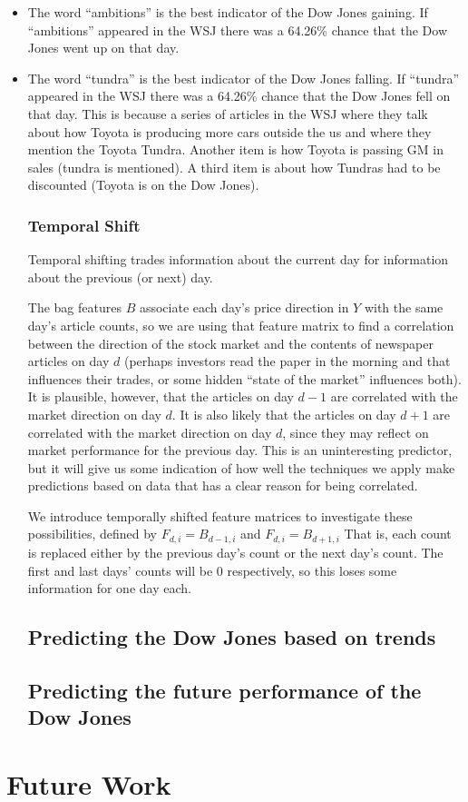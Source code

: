 \documentclass[10pt]{article}
\begin{document}
\begin{itemize}
\item The word ``ambitions'' is the best indicator of the Dow Jones gaining. If ``ambitions'' appeared in the WSJ there was a 64.26\% chance that the Dow Jones went up on that day.
\item The word ``tundra'' is the best indicator of the Dow Jones falling. If ``tundra'' appeared in the WSJ there was a 64.26\% chance that the Dow Jones fell on that day. This is because a series of articles in the WSJ where they talk about how Toyota is producing more cars outside the us and where they mention the Toyota Tundra. Another item is how Toyota is passing GM in sales (tundra is mentioned). A third item is about how Tundras had to be discounted (Toyota is on the Dow Jones).


\subsubsection*{Temporal Shift}
Temporal shifting trades information about the current day for information about the previous (or next) day.


The bag features $B$ associate each day's price direction in $Y$ with the same day's article counts, so we are using that feature matrix to find a correlation between the direction of the stock market and the contents of newspaper articles on day $d$ (perhaps investors read the paper in the morning and that influences their trades, or some hidden ``state of the market'' influences both). It is plausible, however, that the articles on day $d-1$ are correlated with the market direction on day $d$. It is also likely that the articles on day $d+1$ are correlated with the market direction on day $d$, since they may reflect on market performance for the previous day. This is an uninteresting predictor, but it will give us some indication of how well the techniques we apply make predictions based on data that has a clear reason for being correlated.

We introduce temporally shifted feature matrices to investigate these possibilities, defined by $F_{d,i} = B_{d-1,i}$ and $F_{d,i} = B_{d+1,i}$ That is, each count is replaced either by the previous day's count or the next day's count. The first and last days' counts will be 0 respectively, so this loses some information for one day each.

\subsection{Predicting the Dow Jones based on trends}


\subsection{Predicting the future performance of the Dow Jones}

\end{itemize}

\section{Future Work}



\end{document}
